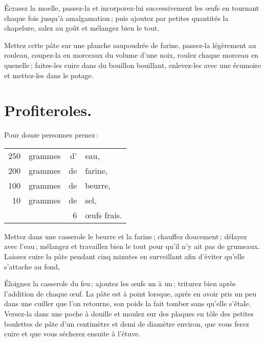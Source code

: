Écrasez la moelle, passez-la et incorporez-lui successivement les œufs en
tournant chaque fois jusqu'à amalgamation ; puis ajoutez par petites quantités
la chapelure, salez au goût et mélangez bien le tout.

Mettez cette pâte sur une planche saupoudrée de farine, passez-la légèrement au
rouleau, coupez-la en morceaux du volume d'une noix, roulez chaque morceau en
quenelle ; faites-les cuire dans du bouillon bouillant, enlevez-les avec une
écumoire et mettez-les dans le potage.

\section*{\centering Profiteroles.}
\label{pg0258} \hypertarget{p0258}{}

Pour douze personnes prenez :

\medskip

\footnotesize
\begin{longtable}{rrrp{16em}}                                                    
    250 & grammes & d' & eau,                                                                             \\
    200 & grammes & de & farine,                                                                          \\
    100 & grammes & de & beurre,                                                                          \\
     10 & grammes & de & sel,                                                                             \\
        &         &  6 & œufs frais.                                                                      \\
\end{longtable}
\normalsize
                             
Mettez dans une casserole le beurre et la farine ; chauffez doucement ; délayez
avec l'eau ; mélangez et travaillez bien le tout pour qu'il n'y ait pas de
grumeaux. Laissez cuire la pâte pendant cinq minutes en surveillant afin
d'éviter qu'elle s'attache au fond,

Éloignez la casserole du feu ; ajoutez les œufs un à un ; triturez bien après
l'addition de chaque œuf. La pâte est à point lorsque, après en avoir pris un
peu dans une cuiller que l'on retourne, son poids la fait tomber sans qu'elle
s'étale. Versez-la dans une poche à douille et moulez sur des plaques en tôle
des petites boulettes de pâte d'un centimètre et demi de diamètre environ, que
vous ferez cuire et que vous sécherez ensuite à l'étuve.

